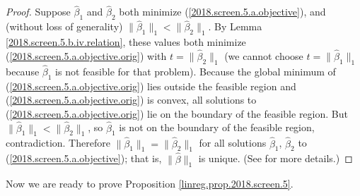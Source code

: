 \begin{proof}
Suppose \(\hat{\beta}_1\) and \(\hat{\beta}_2\) both minimize (\ref{2018.screen.5.a.objective}), and (without loss of generality) \(\lVert \hat{\beta}_1 \rVert_1 < \lVert \hat{\beta}_2 \rVert_1\). By Lemma \ref{2018.screen.5.b.iv.relation}, these values both minimize (\ref{2018.screen.5.a.objective.orig}) with \(t =  \lVert \hat{\beta}_2 \rVert_1\) (we cannot choose \(t =  \lVert \hat{\beta}_1 \rVert_1\) because \(\hat{\beta}_1\) is not feasible for that problem). Because the global minimum of (\ref{2018.screen.5.a.objective.orig}) lies outside the feasible region and  (\ref{2018.screen.5.a.objective.orig}) is convex, all solutions to (\ref{2018.screen.5.a.objective.orig}) lie on the boundary of the feasible region. But \(\lVert\hat{\beta}_1 \rVert_1 < \lVert \hat{\beta}_2 \rVert_1\), so \(\hat{\beta}_1\) is not on the boundary of the feasible region, contradiction. Therefore \(\lVert \hat{\beta}_1 \rVert_1 = \lVert \hat{\beta}_2 \rVert_1\) for all solutions \(\hat{\beta}_1\), \(\hat{\beta}_2\) to (\ref{2018.screen.5.a.objective}); that is,  \(\lVert \hat{\beta} \rVert_1\) is unique. (See \citet{Osborne2000} for more details.)

\end{proof}

Now we are ready to prove Proposition \ref{linreg.prop.2018.screen.5}.


